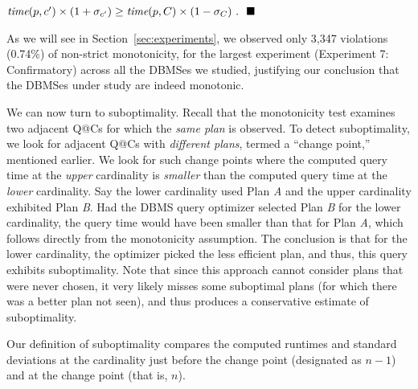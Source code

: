 \documentclass[prodmode,acmtods]{acmsmall}
\makeatletter
\def\QatC{Q{@}C}
\makeatother
\begin{document}
\quad\quad\quad\quad\quad$\hbox{\em time} (p, c^{\prime}) \times (1+\sigma_{c^{\prime}}) \geq
\hbox{\em time} (p,C) \times (1-\sigma_{C})~.~~\hfill\blacksquare$

\vspace{1em}
As we will see in Section~\ref{sec:experiments}, we observed only 3,347
violations (0.74\%) of non-strict monotonicity, for the largest experiment
(Experiment 7: Confirmatory) across all
the \hbox{DBMSes} we studied, justifying our conclusion that the \hbox{DBMSes} under
study are indeed monotonic.

We can now turn to suboptimality. Recall that the monotonicity test examines
two adjacent {\QatC}s for which the {\em same plan} is observed. To detect
suboptimality, we look for adjacent {\QatC}s with {\em different plans}, termed
a ``change point,'' mentioned earlier. We look for such change points where the computed
query time at the {\em upper} cardinality is {\em smaller} than the computed
query time at the {\em lower} cardinality. Say the lower cardinality used
Plan {\em A} and the upper cardinality exhibited Plan {\em B}. Had the \hbox{DBMS}
query optimizer selected Plan {\em B} for the lower cardinality, the query time would have been smaller than that for
Plan {\em A}, which follows directly from the
monotonicity assumption. The conclusion is that for the lower cardinality, the
optimizer picked the less efficient plan, and thus, this query exhibits
\hbox{suboptimality}. Note that since this approach cannot consider plans
that were never chosen, it very likely misses some suboptimal plans (for
which there was a better plan not seen), and thus produces a
conservative estimate of suboptimality.

Our definition of suboptimality compares the computed runtimes 
and standard deviations at the cardinality just before the change
point (designated as $n-1$) and at the change point (that is, $n$).
\end{document}
